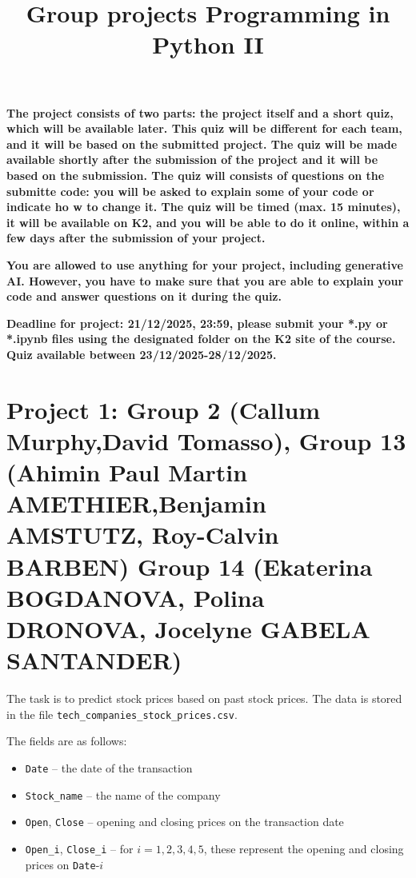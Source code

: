 \documentclass{article}
\title{Group projects Programming in Python II}
\author{}
\date{}
\begin{document}
\maketitle

\textbf{
   The project consists of two parts: the project itself and a short quiz, which will be available later.
   This quiz will be different for each team,
   and it will be based on the submitted project. The quiz will be made available shortly after the submission of the project and it will be based on the
   submission. The quiz will consists of questions on the submitte code: you will be asked to explain some of your code or indicate ho
   w to change it.
   The quiz will be timed (max. 15 minutes), it will be available on K2, and you will be able to do it online, within a few days after the submission of your project. }
   
   \textbf{You are allowed to use anything for your project, including generative AI. However, you have to make sure that you are able to explain your code and answer questions on it
   during the quiz. }

  \textbf{ Deadline for project: 21/12/2025, 23:59,  please submit your *.py or *.ipynb files using the designated folder on the K2 site of the course.  Quiz available
   between 23/12/2025-28/12/2025.
}



\section*{Project 1: Group 2 (Callum Murphy,David Tomasso),
Group 13 (Ahimin Paul Martin AMETHIER,Benjamin  AMSTUTZ, Roy-Calvin BARBEN)
Group 14 (Ekaterina BOGDANOVA, Polina DRONOVA, Jocelyne GABELA SANTANDER)
}
The task is to predict stock prices based on past stock prices. The data is stored in the file \lstinline$tech_companies_stock_prices.csv$.

The fields are as follows:
\begin{itemize} \item \lstinline$Date$ -- the date of the transaction 
\item \lstinline$Stock_name$ -- the name of the company 
\item \lstinline$Open$, \lstinline$Close$ -- opening and closing prices on the transaction date 
\item \lstinline$Open_i$, \lstinline$Close_i$ -- for $i=1,2,3,4,5$, these represent the opening and closing prices on \lstinline$Date$-$i$ 
\end{itemize}
\end{document}
